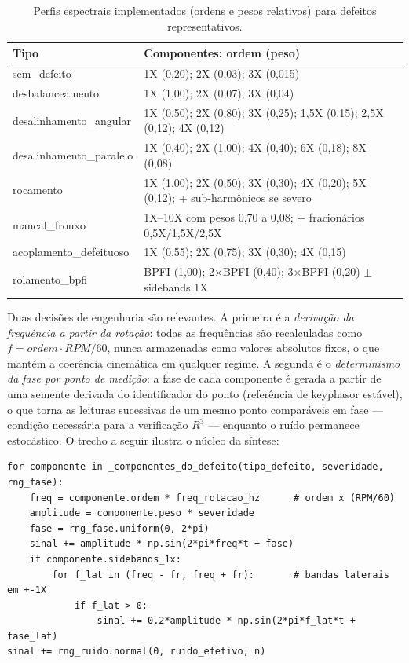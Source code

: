 \begin{table}[htbp]
\centering
\caption{Perfis espectrais implementados (ordens e pesos relativos) para defeitos representativos.}
\label{tab:perfis}
\begin{tabular}{@{}p{4.2cm}p{8.8cm}@{}}
\toprule
\textbf{Tipo} & \textbf{Componentes: ordem (peso)} \\
\midrule
sem\_defeito & 1X (0,20); 2X (0,03); 3X (0,015) \\
desbalanceamento & 1X (1,00); 2X (0,07); 3X (0,04) \\
desalinhamento\_angular & 1X (0,50); 2X (0,80); 3X (0,25); 1,5X (0,15); 2,5X (0,12); 4X (0,12) \\
desalinhamento\_paralelo & 1X (0,40); 2X (1,00); 4X (0,40); 6X (0,18); 8X (0,08) \\
rocamento & 1X (1,00); 2X (0,50); 3X (0,30); 4X (0,20); 5X (0,12); + sub-harmônicos se severo \\
mancal\_frouxo & 1X--10X com pesos 0,70 a 0,08; + fracionários 0,5X/1,5X/2,5X \\
acoplamento\_defeituoso & 1X (0,55); 2X (0,75); 3X (0,30); 4X (0,15) \\
rolamento\_bpfi & BPFI (1,00); 2$\times$BPFI (0,40); 3$\times$BPFI (0,20) $\pm$ sidebands 1X \\
\bottomrule
\end{tabular}
\par{}
\end{table}

Duas decisões de engenharia são relevantes. A primeira é a \emph{derivação da
frequência a partir da rotação}: todas as frequências são recalculadas como
\(f = ordem \cdot RPM/60\), nunca armazenadas como valores absolutos fixos, o
que mantém a coerência cinemática em qualquer regime. A segunda é o
\emph{determinismo da fase por ponto de medição}: a fase de cada componente é
gerada a partir de uma semente derivada do identificador do ponto (referência
de keyphasor estável), o que torna as leituras sucessivas de um mesmo ponto
comparáveis em fase --- condição necessária para a verificação \(R^3\) ---
enquanto o ruído permanece estocástico. O trecho a seguir ilustra o núcleo da
síntese:

\begin{verbatim}
for componente in _componentes_do_defeito(tipo_defeito, severidade, rng_fase):
    freq = componente.ordem * freq_rotacao_hz      # ordem x (RPM/60)
    amplitude = componente.peso * severidade
    fase = rng_fase.uniform(0, 2*pi)
    sinal += amplitude * np.sin(2*pi*freq*t + fase)
    if componente.sidebands_1x:
        for f_lat in (freq - fr, freq + fr):       # bandas laterais em +-1X
            if f_lat > 0:
                sinal += 0.2*amplitude * np.sin(2*pi*f_lat*t + fase_lat)
sinal += rng_ruido.normal(0, ruido_efetivo, n)
\end{verbatim}


